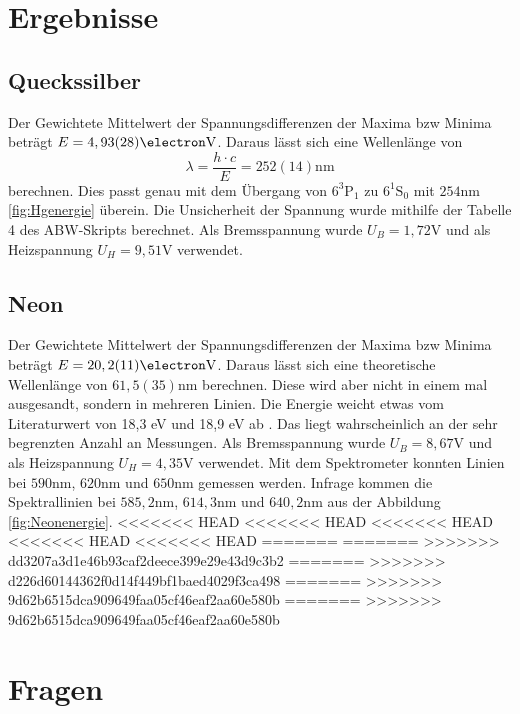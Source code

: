 \documentclass[11pt, a4paper]{article}
\begin{document}
    \section{Ergebnisse}

    \subsection{Queckssilber}

    Der Gewichtete Mittelwert der Spannungsdifferenzen der Maxima bzw Minima beträgt $E = 4,93(28) \si{\electron\volt}$. Daraus lässt sich eine Wellenlänge von 
    \begin{equation}
        \lambda = \frac{h \cdot c}{E} = 252(14) \si{\nano\meter}
    \end{equation}
    berechnen. Dies passt genau mit dem Übergang von $6^3\text{P}_1$ zu $6^1\text{S}_0$ mit $254 \si{\nano\meter}$ \ref{fig:Hgenergie} überein.
    Die Unsicherheit der Spannung wurde mithilfe der Tabelle 4 des ABW-Skripts \cite{ABW} berechnet. Als Bremsspannung wurde $U_B = 1,72 \si{\volt}$ und als Heizspannung $U_H = 9,51 \si{\volt}$ verwendet.

    \subsection{Neon}

    Der Gewichtete Mittelwert der Spannungsdifferenzen der Maxima bzw Minima beträgt $E = 20,2(11) \si{\electron\volt}$. Daraus lässt sich eine theoretische Wellenlänge von $61,5(35) \si{\nano\meter}$ berechnen. Diese wird aber nicht in einem mal ausgesandt, sondern in mehreren Linien. Die Energie weicht etwas vom Literaturwert von 18,3 eV und 18,9 eV ab \cite{FHV}. Das liegt wahrscheinlich an der sehr begrenzten Anzahl an Messungen.
    Als Bremsspannung wurde $U_B = 8,67 \si{\volt}$ und als Heizspannung $U_H = 4,35 \si{\volt}$ verwendet.
    Mit dem Spektrometer konnten Linien bei $590 \si{\nano\meter}$, $620 \si{\nano\meter}$ und $650 \si{\nano\meter}$ gemessen werden. Infrage kommen die Spektrallinien bei $585,2 \si{\nano\meter}$, $614,3 \si{\nano\meter}$ und $640,2 \si{\nano\meter}$ aus der Abbildung \ref{fig:Neonenergie}.
<<<<<<< HEAD
<<<<<<< HEAD
<<<<<<< HEAD
<<<<<<< HEAD
<<<<<<< HEAD
=======
=======
>>>>>>> dd3207a3d1e46b93caf2deece399e29e43d9c3b2
=======
>>>>>>> d226d60144362f0d14f449bf1baed4029f3ca498
=======
>>>>>>> 9d62b6515dca909649faa05cf46eaf2aa60e580b
=======
>>>>>>> 9d62b6515dca909649faa05cf46eaf2aa60e580b

    \section{Fragen}
\end{document}
